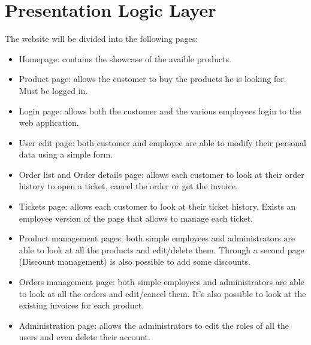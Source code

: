 \section{Presentation Logic Layer}


The website will be divided into the following pages:
\begin{itemize}
    \item Homepage: contains the showcase of the avaible products.
    \item Product page: allows the customer to buy the products he is looking for. Must be logged in.
    \item Login page: allows both the customer and the various employees login to the web application. 
    \item User edit page: both customer and employee are able to modify their personal data using a simple form. 
    \item Order list and Order details page: allows each customer to look at their order history to open a ticket, cancel the order or get the invoice.
    \item Tickets page: allows each customer to look at their ticket history. Exists an employee version of the page that allows to manage each ticket.
    \item Product management pages: both simple employees and administrators are able to look at all the products and edit/delete them. Through a second page (Discount management) is also possible to add some discounts.
    \item Orders management page: both simple employees and administrators are able to look at all the orders and edit/cancel them. It's also possible to look at the existing invoices for each product.
    \item Administration page: allows the administrators to edit the roles of all the users and even delete their account.
\end{itemize}

